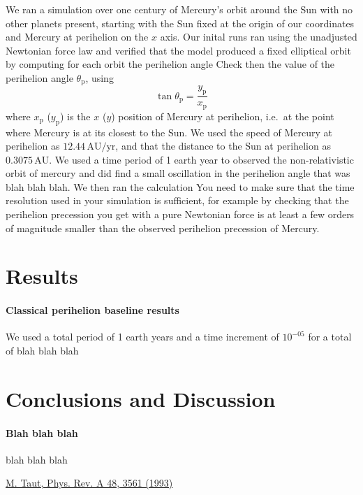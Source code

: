 \documentclass[10pt,showpacs,preprintnumbers,footinbib,amsmath,amssymb,aps,prl,twocolumn,groupedaddress,superscriptaddress,showkeys]{revtex4-1}
\begin{document}
We ran a simulation 
over one century of Mercury's orbit around the Sun with no other planets present, starting with the Sun fixed at the origin of our coordinates and Mercury at perihelion on the $x$ axis. Our inital runs ran using the unadjusted Newtonian force law and verified that the model produced a fixed elliptical orbit by computing for each orbit the perihelion angle
Check then the value of the perihelion angle $\theta_\mathrm{p}$, using
\[
\tan \theta_\mathrm{p} = \frac{y_\mathrm{p}}{x_\mathrm{p}}
\]
where $x_\mathrm{p}$ ($y_\mathrm{p}$) is the $x$ ($y$) position of Mercury at perihelion, i.e.~at the point
where Mercury is at its closest to the Sun. We used the speed of Mercury at perihelion as $12.44\,\mathrm{AU}/\mathrm{yr}$, and that the distance to the Sun
at perihelion as $0.3075\,\mathrm{AU}$. We used a time period of 1 earth year to observed the non-relativistic  orbit of mercury and did find a small oscillation in the perihelion angle that was blah blah blah.\newline
We then ran the calculation 
You need to make sure that the time resolution used in your simulation
is sufficient, for example by checking that the perihelion precession you get with a pure Newtonian force is at least
a few orders of magnitude smaller than the observed perihelion precession of Mercury.
\section{Results}
\paragraph{Classical perihelion baseline results}
We used a total period of 1 earth years and a time increment of $10^{-05}$ for a total of 
blah blah blah
\section{Conclusions and Discussion}
\paragraph{Blah blah blah}
blah blah blah
\begin{thebibliography}{99}
\href{http://prola.aps.org/abstract/PRA/v48/i5/p3561_1}{M. Taut, Phys. Rev. A 48, 3561 (1993)}
\end{thebibliography}
\end{document}
